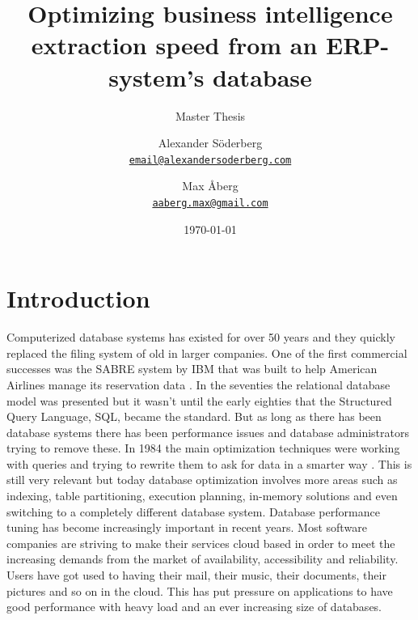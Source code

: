 \documentclass{cslthse-msc}
\author{
	Alexander Söderberg \\
	{\normalsize \href{mailto:email@alexandersoderberg.com}{\texttt{email@alexandersoderberg.com}}}
	\and
	Max Åberg \\
    {\normalsize \href{mailto:aaberg.max@gmail.com}{\texttt{aaberg.max@gmail.com}}}
}
\title{Optimizing business intelligence
extraction speed from an
ERP-system’s database}
\subtitle{Master Thesis}
\date{\today}
\begin{document}
\makefrontmatter

\chapter[Introduction]{Introduction}
Computerized database systems has existed for over 50 years and they quickly replaced the filing system of old in larger companies. One of the first commercial successes was the SABRE system by IBM that was built to help American Airlines manage its reservation data \cite{Head02}. In the seventies the relational database model was presented but it wasn't until the early eighties that the Structured Query Language, SQL, became the standard. But as long as there has been database systems there has been performance issues and database administrators trying to remove these. In 1984 the main optimization techniques were working with queries and trying to rewrite them to ask for data in a smarter way \cite{jarke1984query}. This is still very relevant but today database optimization involves more areas such as indexing, table partitioning, execution planning, in-memory solutions and even switching to a completely different database system.
Database performance tuning has become increasingly important in recent years. Most software companies are striving to make their services cloud based in order to meet the increasing demands from the market of availability, accessibility and reliability. Users have got used to having their mail, their music, their documents, their pictures and so on in the cloud. This has put pressure on applications to have good performance with heavy load and an ever increasing size of databases.\\\\
\end{document}
